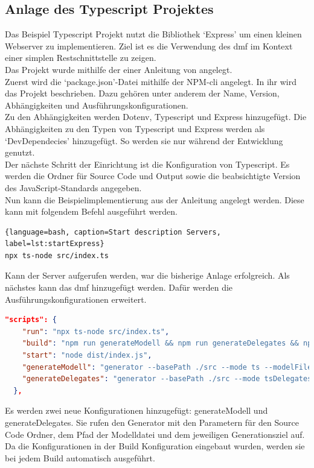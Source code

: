 \documentclass[./einleitung.tex]{subfiles}
\begin{document}
    \subsection{Anlage des Typescript Projektes}\label{subsec:anlage-des-typescript-projektes}
    Das Beispiel Typescript Projekt nutzt die Bibliothek `Express' um einen kleinen Webserver zu implementieren.
    Ziel ist es die Verwendung des \acrshort{dmf} im Kontext einer simplen Restschnittstelle zu zeigen.\\
    Das Projekt wurde mithilfe der einer Anleitung von \citeauthor{initExpress} angelegt.\\
    Zuerst wird die `package.json'-Datei mithilfe der NPM-\acrshort{cli} angelegt.
    In ihr wird das Projekt beschrieben.
    Dazu gehören unter anderem der Name, Version, Abhängigkeiten und Ausführungskonfigurationen.\\
    Zu den Abhängigkeiten werden Dotenv, Typescript und Express hinzugefügt.
    Die Abhängigkeiten zu den Typen von Typescript und Express werden als `DevDependecies' hinzugefügt.
    So werden sie nur während der Entwicklung genutzt.\\
    Der nächste Schritt der Einrichtung ist die Konfiguration von Typescript.
    Es werden die Ordner für Source Code und Output sowie die beabsichtigte Version des JavaScript-Standards angegeben.\\
    Nun kann die Beispielimplementierung aus der Anleitung angelegt werden.
    Diese kann mit folgendem Befehl ausgeführt werden.
    \begin{lstlisting}{language=bash, caption=Start description Servers, label=lst:startExpress}
npx ts-node src/index.ts
    \end{lstlisting}
    Kann der Server aufgerufen werden, war die bisherige Anlage erfolgreich.
    Als nächstes kann das \acrshort{dmf} hinzugefügt werden.
    Dafür werden die Ausführungskonfigurationen erweitert.
    \begin{lstlisting}[language=json, caption=Ausführungskonfigurationen in package.json, label=lst:packageScripts]
"scripts": {
    "run": "npx ts-node src/index.ts",
    "build": "npm run generateModell && npm run generateDelegates && npx tsc",
    "start": "node dist/index.js",
    "generateModell": "generator --basePath ./src --mode ts --modelFile ../Modell/domain.dmf",
    "generateDelegates": "generator --basePath ./src --mode tsDelegates --modelFile ../Modell/domain.dmf",
  },
    \end{lstlisting}
    Es werden zwei neue Konfigurationen hinzugefügt: generateModell und generateDelegates.
    Sie rufen den Generator mit den Parametern für den Source Code Ordner, dem Pfad der Modelldatei und dem jeweiligen Generationsziel auf.
    Da die Konfigurationen in der Build Konfiguration eingebaut wurden, werden sie bei jedem Build automatisch ausgeführt.
\end{document}
